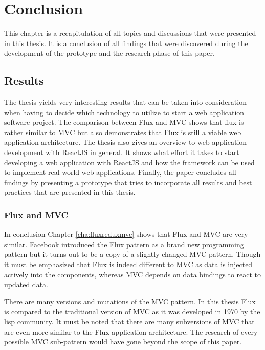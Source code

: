\chapter{Conclusion}
\label{cha:conclusion}

This chapter is a recapitulation of all topics and discussions that were presented in this thesis. It is a conclusion of all findings that were discovered during the development of the prototype and the research phase of this paper.

\section{Results}

The thesis yields very interesting results that can be taken into consideration when having to decide which technology to utilize to start a web application software project. The comparison between Flux and MVC shows that flux is rather similar to MVC but also demonstrates that Flux is still a viable web application architecture. The thesis also gives an overview to web application development with ReactJS in general. It shows what effort it takes to start developing a web application with ReactJS and how the framework can be used to implement real world web applications. Finally, the paper concludes all findings by presenting a prototype that tries to incorporate all results and best practices that are presented in this thesis.

\subsection{Flux and MVC}

In conclusion Chapter \ref{cha:fluxreduxmvc} shows that Flux and MVC are very similar. Facebook introduced the Flux pattern as a brand new programming pattern but it turns out to be a copy of a slightly changed MVC pattern. Though it must be emphasized that Flux is indeed different to MVC as data is injected actively into the components, whereas MVC depends on data bindings to react to updated data.

There are many versions and mutations of the MVC pattern. In this thesis Flux is compared to the traditional version of MVC as it was developed in 1970 by the lisp community. It must be noted that there are many subversions of MVC that are even more similar to the Flux application architecture. The research of every possible MVC sub-pattern would have gone beyond the scope of this paper.

